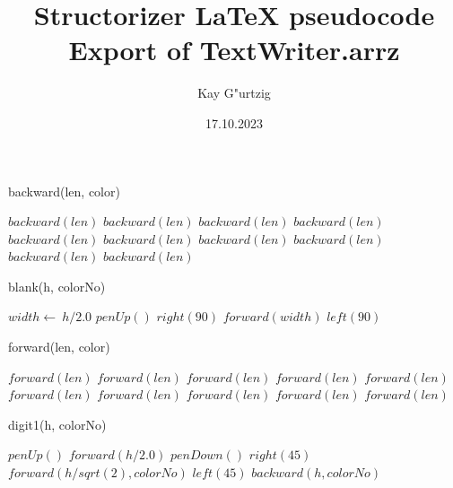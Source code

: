\documentclass[a4paper,10pt]{article}
\title{Structorizer LaTeX pseudocode Export of TextWriter.arrz}
\author{Kay G"urtzig}
\date{17.10.2023}
\begin{document}
\begin{algorithm}
\caption{backward(len, color)}
\begin{algorithmic}[5]

    \STATE \(backward(len)\)
    \STATE \(backward(len)\)
    \STATE \(backward(len)\)
    \STATE \(backward(len)\)
    \STATE \(backward(len)\)
    \STATE \(backward(len)\)
    \STATE \(backward(len)\)
    \STATE \(backward(len)\)
    \STATE \(backward(len)\)
    \STATE \(backward(len)\)
  \ENDIF

\end{algorithmic}
\end{algorithm}


\begin{algorithm}
\caption{blank(h, colorNo)}
\begin{algorithmic}[5]

\STATE {}
  \STATE \(width\gets\ h/2.0\)
  \STATE \(penUp()\)
  \STATE \(right(90)\)
  \STATE \(forward(width)\)
  \STATE \(left(90)\)

\end{algorithmic}
\end{algorithm}


\begin{algorithm}
\caption{forward(len, color)}
\begin{algorithmic}[5]

    \STATE \(forward(len)\)
    \STATE \(forward(len)\)
    \STATE \(forward(len)\)
    \STATE \(forward(len)\)
    \STATE \(forward(len)\)
    \STATE \(forward(len)\)
    \STATE \(forward(len)\)
    \STATE \(forward(len)\)
    \STATE \(forward(len)\)
    \STATE \(forward(len)\)
  \ENDIF

\end{algorithmic}
\end{algorithm}


\begin{algorithm}
\caption{digit1(h, colorNo)}
\begin{algorithmic}[5]

\STATE {}
\STATE {}
  \STATE \(penUp()\)
  \STATE \(forward(h/2.0)\)
  \STATE \(penDown()\)
  \STATE \(right(45)\)
  \STATE \(forward(h/sqrt(2),colorNo)\)
  \STATE \(left(45)\)
  \STATE \(backward(h,colorNo)\)

\end{algorithmic}
\end{algorithm}
\end{document}
